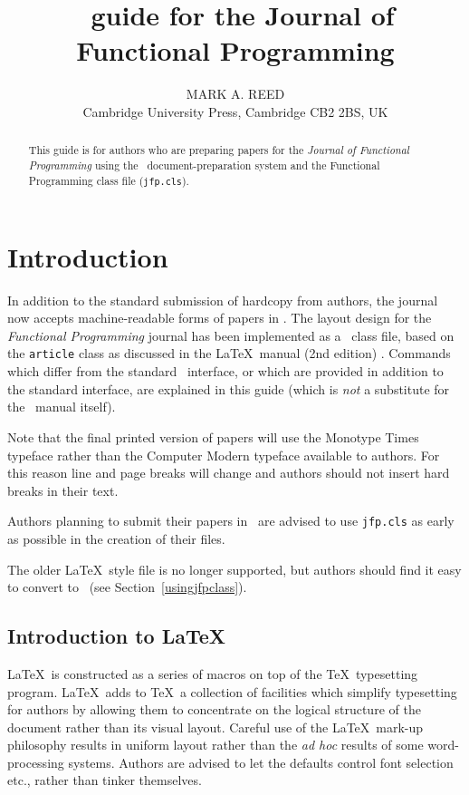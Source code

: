 \documentclass{jfp}
\title[Journal of Functional Programming]
      {\LaTeXe\ guide for the Journal of Functional Programming}
\author[M. A. Reed]
        {MARK A. REED\\
         Cambridge University Press, Cambridge CB2 2BS, UK\\
         \email{texline@cambridge.org}}
\begin{document}
\label{firstpage}

\maketitle

\begin{abstract}
This guide is for authors who are preparing papers for the \emph{Journal of
Functional Programming} using the \LaTeXe\ document-preparation system
and the Functional Programming class file (\texttt{jfp.cls}).
\end{abstract}

\tableofcontents

\section{Introduction}

In addition to the standard submission of hardcopy from authors, the
journal now accepts machine-readable forms of papers
in \LaTeXe. The layout design for the \emph{Functional Programming} journal
has been implemented as a \LaTeXe\ class file, based on the \verb"article"
class as discussed in the \LaTeX\ manual (2nd edition) \cite{LaTeX}.
Commands which differ from the standard \LaTeXe\ interface, or which are
provided in addition to the standard interface, are explained in this
guide (which is \emph{not} a substitute for the \LaTeXe\ manual itself).

Note that the final printed version of papers will use the Monotype Times
typeface rather than the Computer Modern typeface available to authors. For
this reason line and page breaks will change and authors should not insert
hard breaks in their text.

Authors planning to submit their papers in \LaTeXe\ are advised to use
\verb"jfp.cls" as early as possible in the creation of their files.

The older \LaTeX\ style file is no longer supported, but authors should
find it easy to convert to \LaTeXe\ (see Section~\ref{usingjfpclass}).

\subsection{Introduction to \LaTeX}

\LaTeX\ is constructed as a series of macros on top of the \TeX\ typesetting
program. \LaTeX\ adds to \TeX\ a collection of facilities which simplify
typesetting for authors by allowing them to concentrate on the logical
structure of the document rather than its visual layout. Careful use of the
\LaTeX\ mark-up philosophy results in uniform layout rather than the
\emph{ad hoc} results of some word-processing systems. Authors are advised to
let the defaults control font selection etc., rather than tinker themselves.
\end{document}
